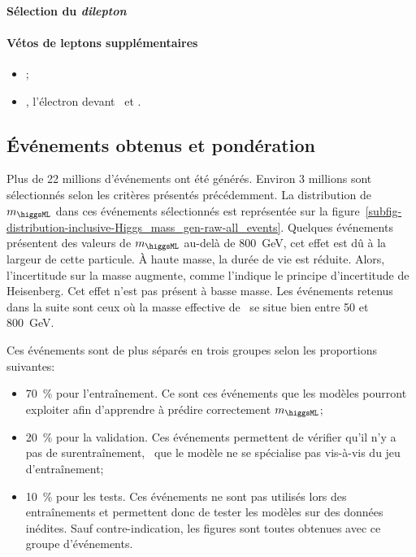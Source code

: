 \paragraph{Sélection du \emph{dilepton}}
\AtLeastOneOSPair{\ele\ele}
\IfMoreOnePair
\paragraph{Vétos de leptons supplémentaires}
\LeptonVetoes
\begin{itemize}
    \item \LeptonVetoesSecondMuon;
    \item \LeptonVetoesSecondEle, l'électron devant \PassConversionVeto\ et \LessTwoMissingHitsVertex.
\end{itemize}
\subsection{Événements obtenus et pondération}
Plus de 22 millions d'événements ont été générés.
Environ 3 millions sont sélectionnés selon les critères présentés précédemment.
La distribution de $m_{\higgsML}$ dans ces événements sélectionnés est représentée sur la figure~\ref{subfig-distribution-inclusive-Higgs_mass_gen-raw-all_events}.
Quelques événements présentent des valeurs de $m_{\higgsML}$ au-delà de \SI{800}{\GeV}, cet effet est dû à la largeur de cette particule.
À haute masse, la durée de vie est réduite.
Alors, l'incertitude sur la masse augmente, comme l'indique le principe d'incertitude de Heisenberg.
Cet effet n'est pas présent à basse masse.
Les événements retenus dans la suite sont ceux où la masse effective de \higgsML\ se situe bien entre \num{50} et \SI{800}{\GeV}.
\par
Ces événements sont de plus séparés en trois groupes selon les proportions suivantes:
\begin{itemize}
\item \SI{70}{\%} pour l'entraînement. Ce sont ces événements que les modèles pourront exploiter afin d'apprendre à prédire correctement $m_{\higgsML}$;
\item \SI{20}{\%} pour la validation. Ces événements permettent de vérifier qu'il n'y a pas de surentraînement, \ie\ que le modèle ne se spécialise pas vis-à-vis du jeu d'entraînement;
\item \SI{10}{\%} pour les tests. Ces événements ne sont pas utilisés lors des entraînements et permettent donc de tester les modèles sur des données inédites. Sauf contre-indication, les figures sont toutes obtenues avec ce groupe d'événements.
\end{itemize}

